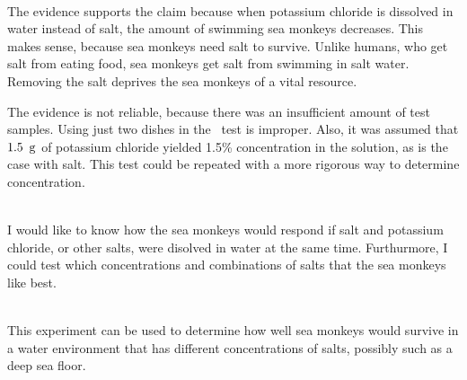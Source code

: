 \documentclass[12pt]{article}
\begin{document}
\\
The evidence supports the claim because when potassium chloride is dissolved in water instead of salt, the amount of swimming sea monkeys decreases. This makes sense, because sea monkeys need salt to survive. Unlike humans, who get salt from eating food, sea monkeys get salt from swimming in salt water. Removing the salt deprives the sea monkeys of a vital resource.\double

The evidence is not reliable, because there was an insufficient amount of test samples. Using just two dishes in the \chisq\ test is improper. Also, it was assumed that $1.5\operatorname{\ g}$ of potassium chloride yielded 1.5\% concentration in the solution, as is the case with salt. This test could be repeated with a more rigorous way to determine concentration.\double

\\
I would like to know how the sea monkeys would respond if salt and potassium chloride, or other salts, were disolved in water at the same time. Furthurmore, I could test which concentrations and combinations of salts that the sea monkeys like best.\double

\\
This experiment can be used to determine how well sea monkeys would survive in a water environment that has different concentrations of salts, possibly such as a deep sea floor.
\end{document}

